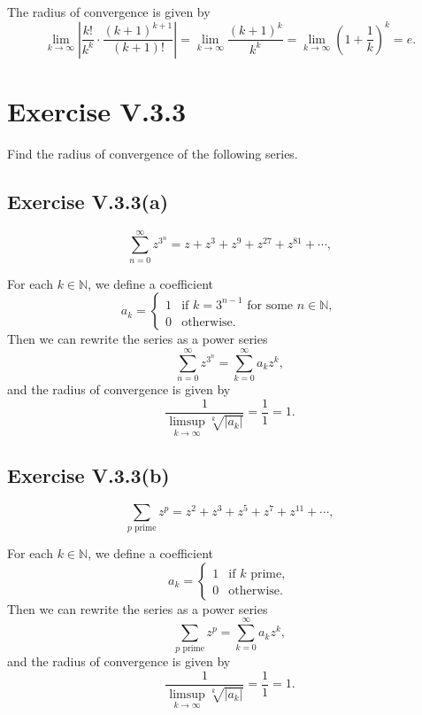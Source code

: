 \documentclass[12pt]{article}
\newenvironment{problem}
    {\begin{lrbox}{\mybox}\begin{minipage}{0.98\textwidth}}
    {\end{minipage}\end{lrbox}\framebox[\textwidth]{\usebox{\mybox}}}
\newcommand{\N}{\mathbb{N}}
\newcommand{\klim}{\lim\limits_{k \to \infty}}
\begin{document}
The radius of convergence is given by
\[
    \klim \left| \frac{k!}{k^k} \cdot \frac{(k+1)^{k+1}}{(k+1)!} \right|
        = \klim \frac{(k+1)^k}{k^k}
        = \klim \left( 1 + \frac1k \right)^k
        = e.
\]


\newpage
\section{Exercise V.3.3}
\begin{problem}
    Find the radius of convergence of the following series.
\end{problem}

\subsection{Exercise V.3.3(a)}
\begin{problem}
    \[
        \sum_{n=0}^\infty z^{3^n} = z + z^3 + z^9 + z^{27} + z^{81} + \cdots,
    \]
\end{problem}
\medskip

For each $k \in \N$, we define a coefficient
\[
    a_k = \begin{cases}
            1 & \text{if $k = 3^{n-1}$ for some $n \in \N$}, \\
            0 & \text{otherwise}.
        \end{cases}
\]
Then we can rewrite the series as a power series
\[
    \sum_{n=0}^\infty z^{3^n} = \sum_{k=0}^\infty a_k z^k,
\]
and the radius of convergence is given by
\[
    \frac{1}{\limsup\limits_{k \to \infty} \sqrt[k]{|a_k|}} = \frac{1}{1} = 1.
\]

\subsection{Exercise V.3.3(b)}
\begin{problem}
    \[
        \sum_{p \text{ prime}} z^p = z^2 + z^3 + z^5 + z^7 + z^{11} + \cdots,
    \]
\end{problem}
\medskip

For each $k \in \N$, we define a coefficient
\[
    a_k = \begin{cases}
            1 & \text{if $k$ prime}, \\
            0 & \text{otherwise}.
        \end{cases}
\]
Then we can rewrite the series as a power series
\[
    \sum_{p \text{ prime}} z^p = \sum_{k=0}^\infty a_k z^k,
\]
and the radius of convergence is given by
\[
    \frac{1}{\limsup\limits_{k \to \infty} \sqrt[k]{|a_k|}} = \frac{1}{1} = 1.
\]
\end{document}

